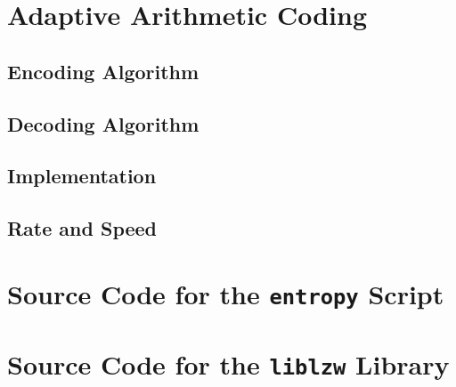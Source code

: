 \documentclass[a4paper, twocolumn]{article}
\begin{document}
    \clearpage
    \section{Adaptive Arithmetic Coding} \label{sec:adaptive_arithmetic_coding}
        \subsection{Encoding Algorithm} \label{sec:aac_encoding_algorithm}
        \subsection{Decoding Algorithm} \label{sec:aac_decoding_algorithm}
        \subsection{Implementation} \label{sec:aac_implementation}
        \subsection{Rate and Speed} \label{sec:aac_rate_and_speed}

    \appendix \onecolumn

    \clearpage
    \section{Source Code for the \texttt{entropy} Script} \label{sec:script}

    

    \section{Source Code for the \texttt{liblzw} Library} \label{sec:liblzw}

    
    

    
    

    
    
    
    
    
    
    
\end{document}
